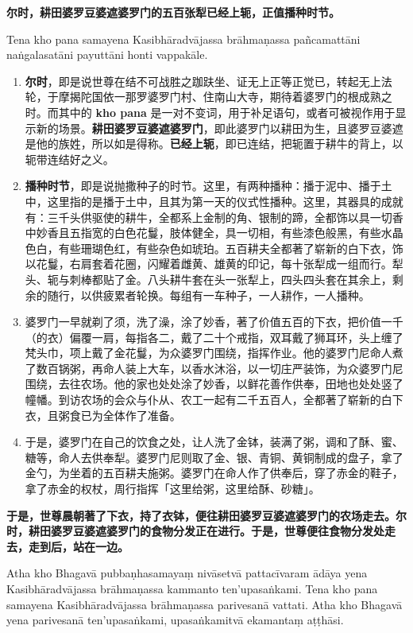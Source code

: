 \textbf{尔时，耕田婆罗豆婆遮婆罗门的五百张犁已经上轭，正值播种时节。}

Tena kho pana samayena Kasibhāradvājassa brāhmaṇassa pañcamattāni naṅgalasatāni payuttāni honti vappakāle.

\begin{enumerate}\item \textbf{尔时}，即是说世尊在结不可战胜之跏趺坐、证无上正等正觉已，转起无上法轮，于摩揭陀国依一那罗婆罗门村、住南山大寺，期待着婆罗门的根成熟之时。而其中的 \textbf{kho pana} 是一对不变词，用于补足语句，或者可被视作用于显示新的场景。\textbf{耕田婆罗豆婆遮婆罗门}，即此婆罗门以耕田为生，且婆罗豆婆遮是他的族姓，所以如是得称。\textbf{已经上轭}，即已连结，把轭置于耕牛的背上，以轭带连结好之义。
\item \textbf{播种时节}，即是说抛撒种子的时节。这里，有两种播种：播于泥中、播于土中，这里指的是播于土中，且其为第一天的仪式性播种。这里，其器具的成就有：三千头供驱使的耕牛，全都系上金制的角、银制的蹄，全都饰以具一切香中妙香且五指宽的白色花鬘，肢体健全，具一切相，有些漆色般黑，有些水晶色白，有些珊瑚色红，有些杂色如琥珀。五百耕夫全都著了崭新的白下衣，饰以花鬘，右肩套着花圈，闪耀着雌黄、雄黄的印记，每十张犁成一组而行。犁头、轭与刺棒都贴了金。八头耕牛套在头一张犁上，四头四头套在其余上，剩余的随行，以供疲累者轮换。每组有一车种子，一人耕作，一人播种。
\item 婆罗门一早就剃了须，洗了澡，涂了妙香，著了价值五百的下衣，把价值一千（的衣）偏覆一肩，每指各二，戴了二十个戒指，双耳戴了狮耳环，头上缠了梵头巾，项上戴了金花鬘，为众婆罗门围绕，指挥作业。他的婆罗门尼命人煮了数百锅粥，再命人装上大车，以香水沐浴，以一切庄严装饰，为众婆罗门尼围绕，去往农场。他的家也处处涂了妙香，以鲜花善作供奉，田地也处处竖了幢幡。到访农场的会众与仆从、农工一起有二千五百人，全都著了崭新的白下衣，且粥食已为全体作了准备。
\item 于是，婆罗门在自己的饮食之处，让人洗了金钵，装满了粥，调和了酥、蜜、糖等，命人去供奉犁。婆罗门尼则取了金、银、青铜、黄铜制成的盘子，拿了金勺，为坐着的五百耕夫施粥。婆罗门在命人作了供奉后，穿了赤金的鞋子，拿了赤金的权杖，周行指挥「这里给粥，这里给酥、砂糖」。\end{enumerate}

\textbf{于是，世尊晨朝著了下衣，持了衣钵，便往耕田婆罗豆婆遮婆罗门的农场走去。尔时，耕田婆罗豆婆遮婆罗门的食物分发正在进行。于是，世尊便往食物分发处走去，走到后，站在一边。}

Atha kho Bhagavā pubbaṇhasamayaṃ nivāsetvā pattacīvaram ādāya yena Kasibhāradvājassa brāhmaṇassa kammanto ten’upasaṅkami. Tena kho pana samayena Kasibhāradvājassa brāhmaṇassa parivesanā vattati. Atha kho Bhagavā yena parivesanā ten’upasaṅkami, upasaṅkamitvā ekamantaṃ aṭṭhāsi.

